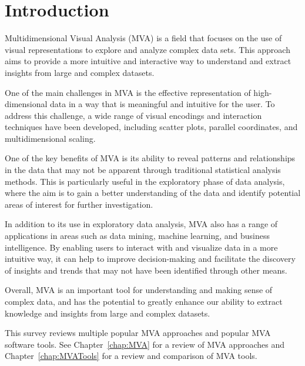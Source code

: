 %
%
% 
% 
% 


\chapter{Introduction}

\label{chap:Intro}



Multidimensional Visual Analysis (MVA) is a field that focuses on the
use of visual representations to explore and analyze complex data
sets. This approach aims to provide a more intuitive and interactive
way to understand and extract insights from large and complex
datasets.

One of the main challenges in MVA is the effective representation of
high-dimensional data in a way that is meaningful and intuitive for
the user. To address this challenge, a wide range of visual encodings
and interaction techniques have been developed, including scatter
plots, parallel coordinates, and multidimensional scaling.

One of the key benefits of MVA is its ability to reveal patterns and
relationships in the data that may not be apparent through traditional
statistical analysis methods. This is particularly useful in the
exploratory phase of data analysis, where the aim is to gain a better
understanding of the data and identify potential areas of interest for
further investigation.

In addition to its use in exploratory data analysis, MVA also has a
range of applications in areas such as data mining, machine learning,
and business intelligence. By enabling users to interact with and
visualize data in a more intuitive way, it can help to improve
decision-making and facilitate the discovery of insights and trends
that may not have been identified through other means.

Overall, MVA is an important tool for understanding and making sense
of complex data, and has the potential to greatly enhance our ability
to extract knowledge and insights from large and complex datasets.

This survey reviews multiple popular MVA approaches and popular MVA
software tools. See Chapter~\ref{chap:MVA} for a review of MVA approaches
and Chapter~\ref{chap:MVATools} for a review and comparison of MVA tools.

